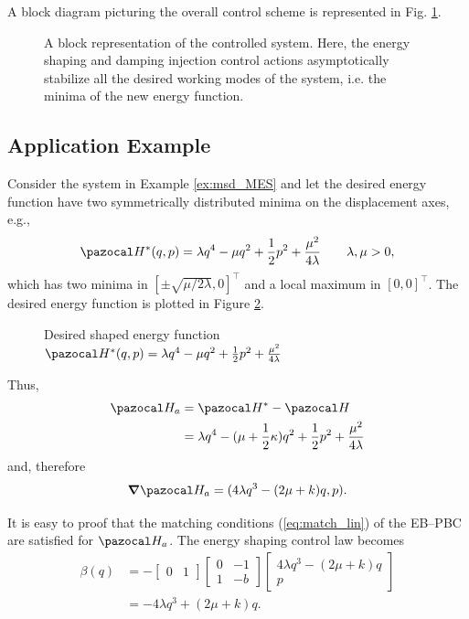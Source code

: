 A block diagram  picturing the overall control scheme is represented in Fig. \ref{fig:block}.
%
\begin{figure}[!h]
	\centering
	
	\caption{A block representation of the controlled system. Here, the energy shaping and damping injection control actions asymptotically stabilize all the desired working modes of the system, i.e. the minima of the new energy function.}
	\label{fig:block}
\end{figure}
%
\subsection{Application Example}
%
Consider the system in Example \ref{ex:msd_MES} and let the desired energy function have two symmetrically distributed minima on the displacement axes, e.g.,
%
\begin{equation}
    \Ha^*(q,p) = \lambda q^4-\mu q^2 + \frac{1}{2}p^2 + \frac{\mu^2}{4\lambda}\qquad\lambda,\mu>0,
\end{equation}
%
which has two minima in $[\pm\sqrt{\mu/2\lambda},0]^\top$ and a local maximum in $[0,0]^\top$. The desired energy function is plotted in Figure \ref{fig:shaped_en}. 
%
\begin{figure}
    \centering
    
    \caption[Desired shaped energy function]{Desired shaped energy function $\Ha^*(q,p) = \lambda q^4-\mu q^2 + \frac{1}{2}p^2 + \frac{\mu^2}{4\lambda}$}
    \label{fig:shaped_en}
\end{figure}
%
Thus, 
%
\begin{align}
    \Ha_a & = \Ha^* - \Ha \\
          & = \lambda q^4-(\mu+\frac{1}{2}\kappa)q^2 + \frac{1}{2}p^2 + \frac{\mu^2}{4\lambda}
\end{align}
%
and, therefore
%
\begin{equation}
    \bm\nabla\Ha_a = (4\lambda q^3-(2\mu + k)q,p).
\end{equation}
%

It is easy to proof that the matching conditions (\ref{eq:match_lin}) of the EB--PBC are satisfied for $\Ha_a$. The energy shaping control law becomes
%
\begin{align}\label{eq:ex_ctrl}
    \beta(q) &= -\begin{bmatrix}0&1\end{bmatrix}\begin{bmatrix}0&-1\\1&-b\end{bmatrix}\begin{bmatrix}4\lambda q^3-(2\mu + k)q\\p\end{bmatrix}\\
             &= -4\lambda q^3+(2\mu + k)q.
\end{align}
%

